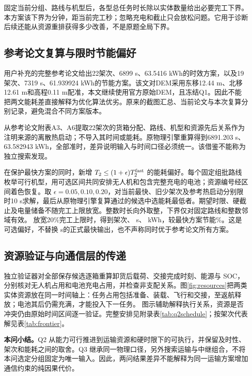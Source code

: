 固定当前分组、路线与机型后，各型总任务时长除以实体数量给出必要完工下界。本方案该下界为\QTwoFixedBound{}分钟，距当前完工\QTwoOrderGain{}秒；忽略充电和截止只会放松问题。它用于诊断后续还能从资源重排获得多少改善，不是原题全局下界。

\subsection{参考论文复算与限时节能偏好}
用户补充的完整参考论文\cite{referencepaper}给出22架次、6899 s、63.5416 kWh的时效方案，以及19架次、7319 s、61.939924 kWh的节能方案。该文对DEM采用东移12.44 m、北移12.61 m和高程0.11 m配准，本文继续使用官方原始DEM，且冻结Q1。因此不能把两文能耗差直接解释为优化算法优劣。原来的截图汇总、当前论文与本次复算分别记录，避免混合不同方案版本。

从参考论文附表A3、A6提取22架次的货箱分配、路线、机型和资源先后关系作为注明来源的离散热启动；不导入其时间或能耗。原物理引擎重算得到6891.203 s、63.582943 kWh，全部准时，差异说明输入与时间口径必须统一。该借鉴不能称为独立搜索发现。

在保护最快方案的同时，新增 $T_2\le(1+\epsilon)T_2^{\rm fast}$ 的能耗偏好。每个固定组批路线枚举可行机型，用可选区间共同安排无人机和包含完整充电的电池；资源编号经区间着色恢复。取 $\epsilon=0.05,0.10,0.20$，对当前最快、旧少架次及参考热启动分别限时10 s求解，最后从原物理引擎复算通过的候选中选能耗最低者。期望时限、硬截止及电量储备不随完工上限放宽。整数时长向外取整，下界仅对固定路线和整数邻域有效。
放宽20\%完工上限时，得到\EnergyChoiceTrips{}架次、\EnergyChoiceTime{} s、\EnergyChoiceEnergy{} kWh，较最快方案节能\EnergyChoiceSaving\%。这是可选偏好，不替换\QTwoTime{} s的正式最快输出，也不声称同时优于参考论文所有方案。

\subsection{资源验证与向通信层的传递}
独立验证器对全部保存候选逐箱重算卸货后载荷、交接完成时刻、能源与 SOC，分别核对无人机占用和电池充电占用，并检查非支配关系。图\ref{fig:resources}把两类实体资源放在同一时间轴上：任务占用包括准备、装载、飞行和交接，至返航释放；电池其后仍需充满，才能投入下一任务。
图示辅助解释执行关系，资源是否冲突仍由原始时间区间逐一验证。完整安排见附录表\ref{tab:q2schedule}；按架次代表解见表\ref{tab:frontier}。

\textbf{本问小结。}Q2 从能力可行推进到运输资源和硬时限下的可执行，并保留及时性、架次和能耗之间的取舍。Q3 继承同一物理口径，另外搜索运输与中继组合，不将本问选定分组固定为唯一输入。因此，两问结果差异不能解释为同一运输方案增加通信约束的纯因果代价。
\FloatBarrier
